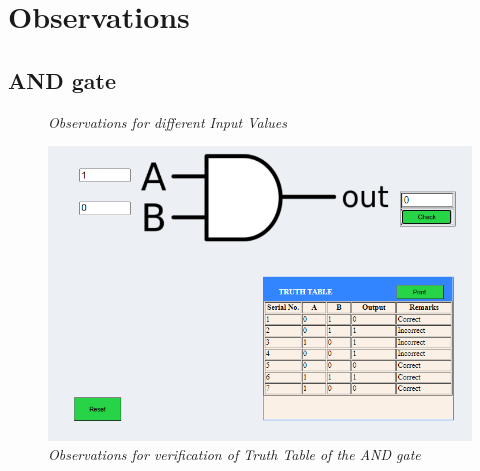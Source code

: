 \section{Observations}
	\subsection{AND gate}
			\begin{figure}[ht]
				\centering 
				\hfill
				\caption{\textit{Observations for different Input Values}}
			\end{figure}
			\begin{figure}[h]
				\centering
				\includegraphics[width=0.85\linewidth]{img/exp1/fig12}
				\caption{\textit{Observations for verification of Truth Table of the AND gate}}
				\label{fig:and_obs_2}
			\end{figure}

